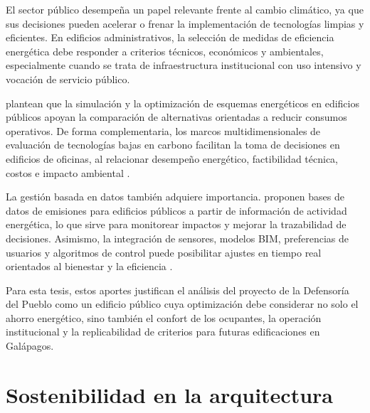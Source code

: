 \begin{textoDosTercios}

El sector público desempeña un papel relevante frente al cambio climático, ya que sus decisiones pueden acelerar o frenar la implementación de tecnologías limpias y eficientes. En edificios administrativos, la selección de medidas de eficiencia energética debe responder a criterios técnicos, económicos y ambientales, especialmente cuando se trata de infraestructura institucional con uso intensivo y vocación de servicio público.

\textcite{liuSimulationAnalysisScheme2019} plantean que la simulación y la optimización de esquemas energéticos en edificios públicos apoyan la comparación de alternativas orientadas a reducir consumos operativos. De forma complementaria, los marcos multidimensionales de evaluación de tecnologías bajas en carbono facilitan la toma de decisiones en edificios de oficinas, al relacionar desempeño energético, factibilidad técnica, costos e impacto ambiental \parencite{liuMultidimensionalEvaluationFramework2025}.

La gestión basada en datos también adquiere importancia. \textcite{guoConstructionMultiSamplePublic2025} proponen bases de datos de emisiones para edificios públicos a partir de información de actividad energética, lo que sirve para monitorear impactos y mejorar la trazabilidad de decisiones. Asimismo, la integración de sensores, modelos BIM, preferencias de usuarios y algoritmos de control puede posibilitar ajustes en tiempo real orientados al bienestar y la eficiencia \parencite{almusaedConstruction50Sustainable2024}.

Para esta tesis, estos aportes justifican el análisis del proyecto de la Defensoría del Pueblo como un edificio público cuya optimización debe considerar no solo el ahorro energético, sino también el confort de los ocupantes, la operación institucional y la replicabilidad de criterios para futuras edificaciones en Galápagos.

\end{textoDosTercios}

\section{Sostenibilidad en la arquitectura}

